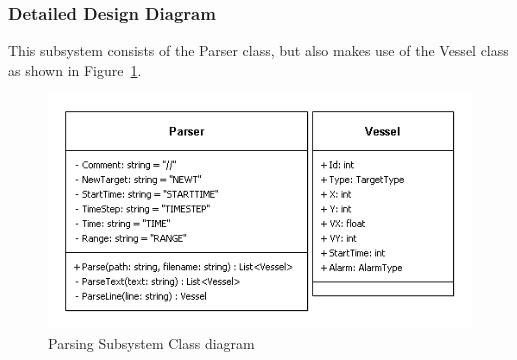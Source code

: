 \documentclass[12pt]{article}
\begin{document}
\subsubsection{Detailed Design Diagram}
This subsystem consists of the Parser class, but also makes use of the Vessel class as shown in Figure~\ref{fig:ParsingSubsystemClassDiagram}.  
\begin{figure}[h!]
    \centering
    \includegraphics[scale=1]{3_4_1_parsingsubsystem}
    \caption{Parsing Subsystem Class diagram}
    \label{fig:ParsingSubsystemClassDiagram}
\end{figure}
\end{document}
